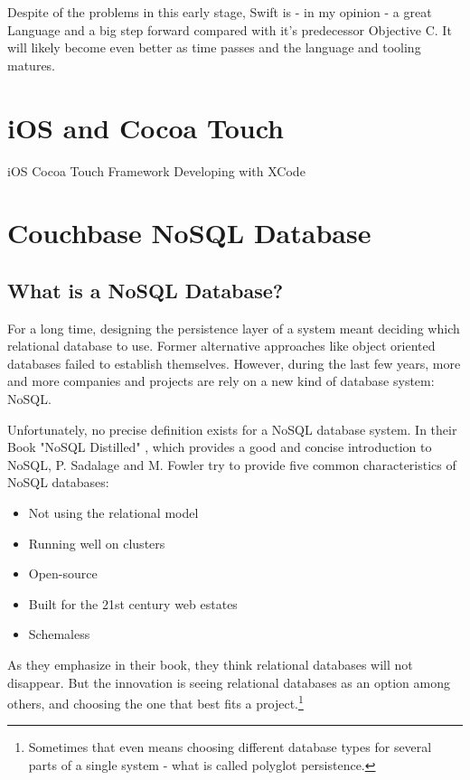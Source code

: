 Despite of the problems in this early stage, Swift is - in my opinion - a great Language and a big step forward compared with it's predecessor Objective C. It will likely become even better as time passes and the language and tooling matures. 



\section{iOS and Cocoa Touch}

iOS Cocoa Touch Framework 
Developing with XCode

\section{Couchbase NoSQL Database}


\subsection{What is a NoSQL Database?}

For a long time, designing the persistence layer of a system meant deciding which relational database to use. Former alternative approaches like object oriented databases failed to establish themselves. 
However, during the last few years, more and more companies and projects are rely on a new kind of database system: NoSQL.

Unfortunately, no precise definition exists for a NoSQL database system. In their Book "NoSQL Distilled" \cite{nosqldistilled}, which provides a good and concise introduction to NoSQL, P. Sadalage and M. Fowler try to provide five common characteristics of NoSQL databases:

\begin{itemize}
\item Not using the relational model
\item Running well on clusters
\item Open-source
\item Built for the 21st century web estates
\item Schemaless
\end{itemize}

As they emphasize in their book, they think relational databases will not disappear. But the innovation is seeing relational databases as an option among others, and choosing the one that best fits a project.\footnote{Sometimes that even means choosing different database types for several parts of a single system - what is called polyglot persistence.} 

